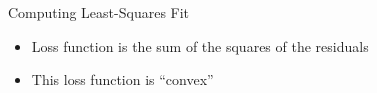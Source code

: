 \documentclass[aspectratio=169]{beamer}
\begin{document}

\begin{frame}{Computing Least-Squares Fit}

	\begin{itemize}
		\item Loss function is the sum of the squares of the residuals
		\item This loss function is ``convex''
\end{itemize}
\end{frame}
\end{document}
